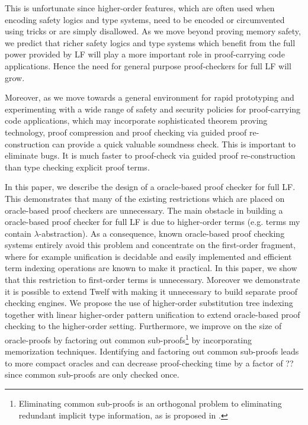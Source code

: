 \documentclass{acmconf}
\begin{document}
This is
unfortunate since higher-order features, which are often used when
encoding safety logics and type systems, need to be encoded or
circumvented using tricks or are simply disallowed. As we move beyond
proving memory safety, we predict that richer safety logics and type
systems which benefit from the full power provided by LF will play a
more important role in proof-carrying code applications. Hence the
need for general purpose proof-checkers for full LF will grow.

Moreover, as we move towards a general environment for rapid
prototyping and experimenting with a wide range of safety and security
policies for proof-carrying code applications, which may incorporate
sophisticated theorem proving technology, proof compression and proof
checking via guided proof re-construction can provide a quick valuable
soundness check. This is important to eliminate bugs. It is much faster to
proof-check via guided proof re-construction than type checking
explicit proof terms.  

In this paper, we describe the design of a oracle-based proof checker for
full LF. This demonstrates that many of the existing restrictions
which are placed on oracle-based proof checkers are unnecessary. The
main obstacle in building a oracle-based proof checker for full LF
is due to higher-order terms (e.g. terms my contain
$\lambda$-abstraction). As a consequence, known oracle-based proof checking
systems entirely avoid this problem and concentrate on the first-order
fragment, where for example unification is decidable and easily
implemented and efficient term indexing operations are known to make
it practical. In this paper, we show that this restriction to
first-order terms is unnecessary. Moreover we demonstrate it is
possible to extend Twelf with making it unnecessary to build separate
proof checking engines.
We propose the use of higher-order substitution tree indexing together
with linear higher-order pattern unification to extend oracle-based
proof checking to the higher-order setting. Furthermore, we improve on
the size of oracle-proofs by factoring out common
sub-proofs\footnote{Eliminating common sub-proofs is an orthogonal
  problem to eliminating redundant implicit type 
  information, as is   proposed in \cite{Necula98lics}.} by
incorporating memorization techniques. Identifying and factoring out
common sub-proofs leads to more compact oracles and can  
decrease proof-checking time by a factor of ?? since common sub-proofs
are only checked once.  
\end{document}
